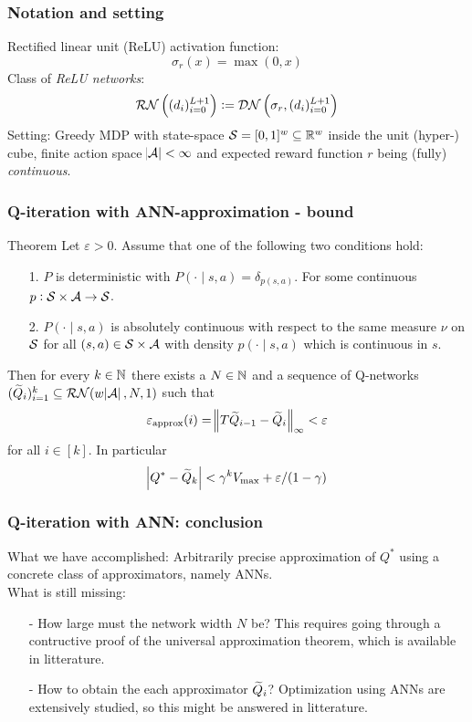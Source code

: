 \documentclass{beamer}[10]
\begin{document}
\begin{frame}
  \frametitle{Notation and setting}
  Rectified linear unit (ReLU) activation function:
  \[ \sigma_r(x) = \max(0,x) \]
  Class of \emph{ReLU networks}:
  \[ \mathcal{RN}\left( (d_i)_{i=0}^{L+1} \right)
  \vcentcolon= \mathcal{DN}\left( \sigma_r, (d_i)_{i=0}^{L+1} \right) \] 
  Setting: Greedy MDP with state-space $\mathcal{S} = [0,1]^w \subseteq \mathbb{R}^w$
  inside the unit (hyper-) cube, finite action space $\abs{\mathcal{A}} < \infty$ and 
  expected reward function $r$ being (fully) \emph{continuous}.
\end{frame}

\begin{frame}
  \frametitle{Q-iteration with ANN-approximation - bound}
  \begingroup \footnotesize
  \begin{block}{Theorem}
    Let $\varepsilon > 0$.
    Assume that one of the following two conditions hold:
    \begin{itemize}
      \item[1.] $P$ is deterministic with $P(\cdot \mid s, a) = \delta_{p(s, a)}$.
	For some continuous $p: \mathcal{S} \times \mathcal{A} \to \mathcal{S}$.
      \item[2.] $P(\cdot \mid s, a)$ is absolutely continuous
	with respect to the same measure $\nu$ on $\mathcal{S}$ for all
	$(s, a) \in \mathcal{S} \times \mathcal{A}$ with density
	$p(\cdot \mid s, a)$ which is continuous in $s$.
    \end{itemize}
    Then for every $k \in \mathbb{N}$ there exists a $N\in \mathbb{N}$ and a sequence of
    Q-networks $(\widetilde{Q}_i)_{i=1}^k \subseteq \mathcal{RN}(w \abs{\mathcal{A}}, N, 1)$
    such that
    \[ \varepsilon_{\mathrm{approx}}(i) = \norm{T\widetilde{Q}_{i-1} - \widetilde{Q}_i}_\infty < \varepsilon \]
    for all $i \in [k]$.
    In particular
    \[ \abs{Q^* - \widetilde{Q}_k} < \gamma^k V_{\max} + \varepsilon/(1 - \gamma) \]
  \end{block}
  \endgroup
\end{frame}

\begin{frame}
  \frametitle{Q-iteration with ANN: conclusion}
  What we have accomplished: Arbitrarily precise approximation of $Q^*$ using
  a concrete class of approximators, namely ANNs.
  \\ What is still missing:
  \begin{itemize}
    \item[-] How large must the network width $N$ be?
      This requires going through a contructive proof of the universal
      approximation theorem, which is available in litterature.
    \item[-] How to obtain the each approximator $\widetilde{Q}_i$? Optimization
      using ANNs are extensively studied, so this might be answered in
      litterature.
  \end{itemize}
\end{frame}
\end{document}
